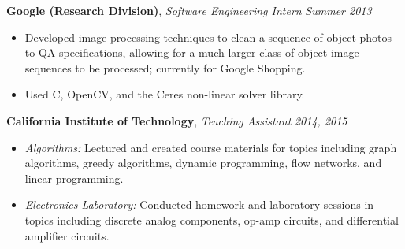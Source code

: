 \documentclass{article}
\newenvironment{changemargin}[2]{%
  \begin{list}{}{%
    \setlength{\topsep}{0pt}%
    \setlength{\leftmargin}{#1}%
    \setlength{\rightmargin}{#2}%
    \setlength{\listparindent}{\parindent}%
    \setlength{\itemindent}{\parindent}%
    \setlength{\parsep}{\parskip}%
  }%
  \item[]}{\end{list}
}
\newenvironment{body} {
	\vspace*{-16pt}
	\begin{changemargin}{-0.25in}{-0.5in}
  }	
	{\end{changemargin}
}
\newcommand{\CC}{C\nolinebreak\hspace{-.05em}\raisebox{.4ex}{\tiny\bf +}\nolinebreak\hspace{-.10em}\raisebox{.4ex}{\tiny\bf +}}
\begin{document}
\begin{body}
	\textbf{Google (Research Division)}, \emph{Software Engineering Intern} \hfill \emph{Summer 2013}\\
	\vspace*{-4pt}
	\begin{itemize}
		\item Developed image processing techniques to clean a sequence of object photos to QA specifications, allowing for a much larger class of object image sequences to be processed; currently for Google Shopping.
		\item Used \CC, OpenCV, and the Ceres non-linear solver library.
	\end{itemize}



	\smallskip

	\textbf{California Institute of Technology}, \emph{Teaching Assistant} \hfill \emph{2014, 2015} \\
	\vspace*{-4pt}
	\begin{itemize}
		\item \emph{Algorithms:} Lectured and created course materials for topics including graph algorithms, greedy algorithms, dynamic programming, flow networks, and linear programming.
		\item \emph{Electronics Laboratory:} Conducted homework and laboratory sessions in topics including discrete analog components, op-amp circuits, and differential amplifier circuits.
	\end{itemize}
\end{body}
\end{document}
